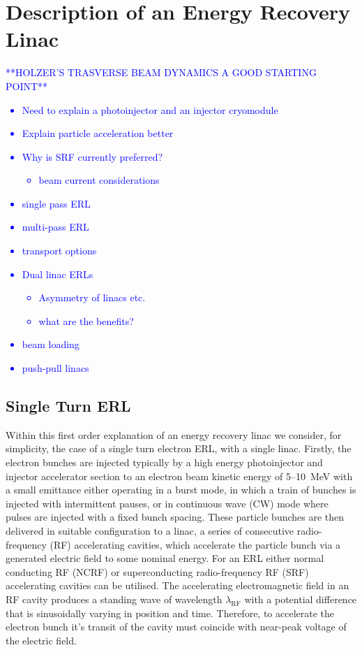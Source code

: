 \documentclass[../main.tex]{subfiles}
\begin{document}
\section{Description of an Energy Recovery Linac}

\textcolor{blue}{**HOLZER'S TRASVERSE BEAM DYNAMICS A GOOD STARTING POINT**}

\textcolor{blue}{\begin{itemize}
    \item{Need to explain a photoinjector and an injector cryomodule}
    \item{Explain particle acceleration better}
    \item{Why is SRF currently preferred?
        \begin{itemize}
            \item{beam current considerations} 
        \end{itemize}}
    \item{single pass ERL}
    \item{multi-pass ERL}
    \item{transport options}
    \item{Dual linac ERLs
        \begin{itemize}
            \item{Asymmetry of linacs etc.}
            \item{what are the benefits?}
        \end{itemize}}
    \item{beam loading}
    \item{push-pull linacs}
\end{itemize}}

\subsection{Single Turn ERL}

Within this first order explanation of an energy recovery linac we consider, for simplicity, the case of a single turn electron ERL, with a single linac. Firstly, the electron bunches are injected typically by a high energy photoinjector and injector accelerator section to an electron beam kinetic energy of 5--10~\si{\mega\electronvolt} with a small emittance either operating in a burst mode, in which a train of bunches is injected with intermittent pauses, or in continuous wave (CW) mode where pulses are injected with a fixed bunch spacing. These particle bunches are then delivered in suitable configuration to a linac, a series of consecutive radio-frequency (RF) accelerating cavities, which accelerate the particle bunch via a generated electric field to some nominal energy. For an ERL either normal conducting RF (NCRF) or superconducting radio-frequency RF (SRF) accelerating cavities can be utilised. The accelerating electromagnetic field in an RF cavity produces a standing wave of wavelength $\lambda_{\mathrm{RF}}$ with a potential difference that is sinusoidally varying in position and time. Therefore, to accelerate the electron bunch it's transit of the cavity must coincide with near-peak voltage of the electric field.   
\end{document}
